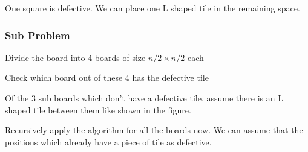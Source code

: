 \documentclass[12pt]{article}
\begin{document}
One square is defective. We can place one L shaped tile in the remaining space.

\subsubsection{Sub Problem}

\begin{enums}[label={(\arabic*)}, noitemsep]
    \item Divide the board into 4 boards of size $n/2 \times n/2$ each
    \item Check which board out of these 4 has the defective tile
    \item Of the 3 sub boards which don't have a defective tile, assume there is an L shaped tile between them like shown in the figure.
    \item Recursively apply the algorithm for all the boards now. We can assume that the positions which already have a piece of tile as defective.
\end{enums}
\end{document}
